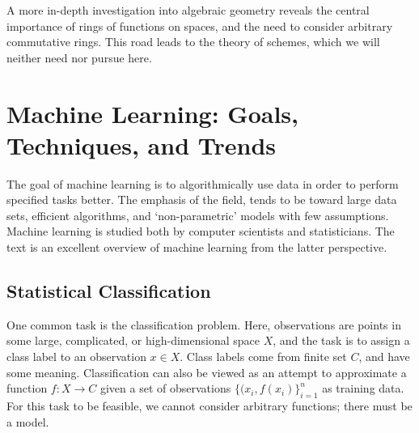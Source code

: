 \documentclass[11pt,titlepage]{article}
\numberwithin{equation}{section}
\begin{document}
    A more in-depth investigation into algebraic geometry reveals the central
    importance of rings of functions on spaces, and the need to consider
    arbitrary commutative rings.  This road leads to the theory of schemes,
    which we will neither need nor pursue here.

\section{Machine Learning: Goals, Techniques, and Trends}
    \label{sec:ML}

    The goal of machine learning is to algorithmically use data in order to
    perform specified tasks better.  The emphasis of the field, tends to be
    toward large data sets, efficient algorithms, and `non-parametric' models
    with few assumptions.  Machine learning is studied both by computer
    scientists and statisticians.  The text \cite{EOSL} is an excellent overview
    of machine learning from the latter perspective.

\subsection{Statistical Classification}

    One common task is the classification problem.  Here, observations are
    points in some large, complicated, or high-dimensional space $X$, and the
    task is to assign a class label to an observation $x \in X$.  Class labels
    come from finite set $C$, and have some meaning.  Classification can also be
    viewed as an attempt to approximate a function $f : X \to C$ given a set of
    observations $\{(x_i, f(x_i)\}_{i=1}^n$ as training data.  For this task to
    be feasible, we cannot consider arbitrary functions; there must be a model.
\end{document}
